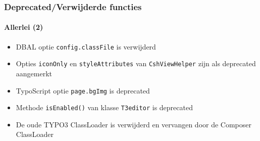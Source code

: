 \begin{frame}[fragile]
	\frametitle{Deprecated/Verwijderde functies}
	\framesubtitle{Allerlei (2)}

	\begin{itemize}

		\item DBAL optie \texttt{config.classFile} is verwijderd

		\item Opties \texttt{iconOnly} en \texttt{styleAttributes} van
			\texttt{CshViewHelper} zijn als deprecated aangemerkt

		\item TypoScript optie \texttt{page.bgImg} is deprecated

		\item Methode \texttt{isEnabled()} van klasse \texttt{T3editor} is deprecated

		\item De oude TYPO3 ClassLoader is verwijderd en vervangen door de Composer ClassLoader

	\end{itemize}

\end{frame}

